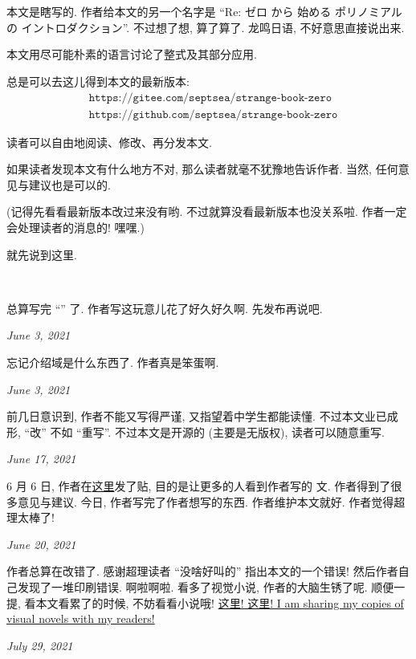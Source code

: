 \section*{\Preface}

本文是瞎写的. 作者给本文的另一个名字是 ``Re: ゼロ から 始める ポリノミアル の イントロダクション''. 不过想了想, 算了算了. 龙鸣日语, 不好意思直接说出来.

本文用尽可能朴素的语言讨论了整式及其部分应用.

总是可以去这儿得到本文的最新版本:
\begin{align*}
     & \texttt{https://gitee.com/septsea/strange-book-zero}  \\
     & \texttt{https://github.com/septsea/strange-book-zero}
\end{align*}

读者可以自由地阅读、修改、再分发本文.

如果读者发现本文有什么地方不对, 那么读者就毫不犹豫地告诉作者. 当然, 任何意见与建议也是可以的.

(记得先看看最新版本改过来没有哟. 不过就算没看最新版本也没关系啦. 作者一定会处理读者的消息的! 嘿嘿.)

就先说到这里.

~\

\providecommand{\appendDate}{}
\renewcommand{\appendDate}[1]{\par \hfill {\itshape \sffamily #1}}

\begin{remark}
    总算写完 ``\Prerequisites '' 了. 作者写这玩意儿花了好久好久啊. 先发布再说吧.
    \appendDate{June 3, 2021}
\end{remark}

\begin{remark}
    忘记介绍域是什么东西了. 作者真是笨蛋啊.
    \appendDate{June 3, 2021}
\end{remark}

\begin{remark}
    前几日意识到, 作者不能又写得严谨, 又指望着中学生都能读懂. 不过本文业已成形, ``改'' 不如 ``重写''. 不过本文是开源的 (主要是无版权), 读者可以随意重写.
    \appendDate{June 17, 2021}
\end{remark}

\begin{remark}
    6 月 6 日, 作者在\hyperref{https://chaoli.club/index.php/6396}{}{}{这里}发了贴, 目的是让更多的人看到作者写的  文. 作者得到了很多意见与建议. 今日, 作者写完了作者想写的东西. 作者维护本文就好. 作者觉得超理太棒了!
    \appendDate{June 20, 2021}
\end{remark}

\begin{remark}
    作者总算在改错了. 感谢超理读者 ``没啥好叫的'' 指出本文的一个错误! 然后作者自己发现了一堆印刷错误. 啊啦啊啦. 看多了视觉小说, 作者的大脑生锈了呢. 顺便一提, 看本文看累了的时候, 不妨看看小说哦! \hyperref{https://gitee.com/septsea/ss}{}{}{这里! 这里! I am sharing my copies of visual novels with my readers!}
    \appendDate{July 29, 2021}
\end{remark}
